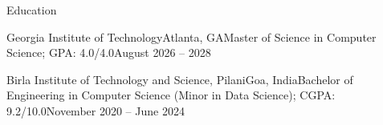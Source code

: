 \begin{rSection}{Education}
    \begin{rSubsectionPlain}{Georgia Institute of Technology}{Atlanta, GA}{Master of Science in Computer Science; GPA: 4.0/4.0}{August 2026 -- 2028}
    \end{rSubsectionPlain}
    \begin{rSubsectionPlain}{Birla Institute of Technology and Science, Pilani}{Goa, India}{Bachelor of Engineering in Computer Science (Minor in Data Science); CGPA: 9.2/10.0}{November 2020 -- June 2024}
    \end{rSubsectionPlain}
\end{rSection}